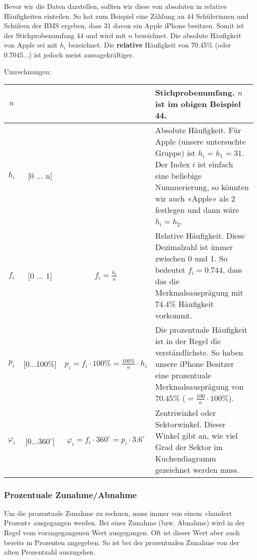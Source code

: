 Bevor wir die Daten darstellen, sollten wir diese von absoluten in
relative Häufigkeiten einteilen. So hat zum Beispiel eine Zählung an
44 Schülerinnen und Schülern der BMS ergeben, dass 31 davon ein Apple
iPhone besitzen. Somit ist der Stichprobenumfang 44 und wird mit $n$
bezeichnet. Die absolute Häufigkeit von Apple sei mit $h_i$
bezeichnet. Die \textbf{relative} Häufigkeit von 70.45\% (oder 0.7045...) ist
jedoch meist aussagekräftiger.

Umrechnungen:

\begin{tabular}{|c|c|c|p{8cm}|}
  \hline
  $n$   &   &  &Stichprobenumfang. $n$ ist im obigen Beispiel 44.\\
  \hline
  $h_i$ & [0 ... n]  & & Absolute Häufigkeit. Für Apple (unsere untersuchte
  Gruppe) ist $h_i=h_1=31$. Der Index $i$ ist einfach eine beliebige
  Nummerierung, so könnten wir auch «Apple» als $2$ festlegen und dann
  wäre $h_i=h_2$.\\
  \hline
  $f_i$ & [0 ... 1] &$f_i = \frac{h_i}{n}$ & Relative
  Häufigkeit. Diese Dezimalzahl ist immer zwischen 0 und 1. So
  bedeutet $f_i=0.744$, dass das die Merkmalsausprägung mit 74.4\%
  Häufigkeit vorkommt.\\
  \hline
  $p_i$ & [0...100\%] & $p_i = f_i\cdot{}100\% =
  \frac{100\%}{n}\cdot{}h_i$ & Die prozentuale Häufigkeit ist in der
  Regel die verständlichste. So haben unsere iPhone Besitzer eine
  prozentuale Merkmalsausprägung von 70.45\%
  ($=\frac{100}{n}\cdot{}100\%$).\\
  \hline
  $\varphi_i$ & [0...$360^{\circ}$] & $\varphi_i = f_i\cdot{}360^\circ
  = p_i\cdot{}3.6^\circ$ &
  Zentriwinkel oder Sektorwinkel. Dieser Winkel gibt an, wie viel Grad
  der Sektor im Kuchendiagramm gezeichnet werden muss.\\
  \hline
\end{tabular}
\newpage



\subsubsection{Prozentuale Zunahme/Abnahme}\index{\%}
Um die prozentuale Zunahme zu rechnen, muss immer von einem «hundert
Prozent» ausgegangen werden. Bei einer Zunahme (bzw. Abnahme) wird in
der Regel vom vorangegangenen Wert ausgegangen. Oft ist dieser Wert
aber auch bereits in Prozenten angegeben. So ist bei der prozentualen
Zunahme von der alten Prozentzahl auszugehen.

